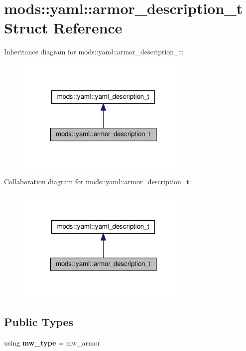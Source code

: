 \hypertarget{structmods_1_1yaml_1_1armor__description__t}{}\section{mods\+:\+:yaml\+:\+:armor\+\_\+description\+\_\+t Struct Reference}
\label{structmods_1_1yaml_1_1armor__description__t}


Inheritance diagram for mods\+:\+:yaml\+:\+:armor\+\_\+description\+\_\+t\+:\nopagebreak
\begin{figure}[H]
\begin{center}
\leavevmode
\includegraphics[width=239pt]{structmods_1_1yaml_1_1armor__description__t__inherit__graph}
\end{center}
\end{figure}


Collaboration diagram for mods\+:\+:yaml\+:\+:armor\+\_\+description\+\_\+t\+:\nopagebreak
\begin{figure}[H]
\begin{center}
\leavevmode
\includegraphics[width=239pt]{structmods_1_1yaml_1_1armor__description__t__coll__graph}
\end{center}
\end{figure}
\subsection*{Public Types}
\begin{DoxyCompactItemize}
\item 
\mbox{\label{structmods_1_1yaml_1_1armor__description__t_acfcf487bdb00185df9e9235d62d9a01c}} 
using {\bfseries mw\+\_\+type} = mw\+\_\+armor
\end{DoxyCompactItemize}
